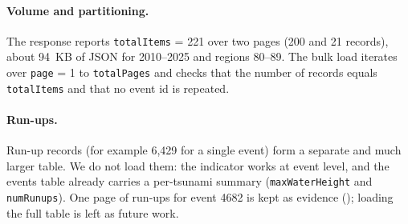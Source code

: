 \documentclass[a4paper,11pt,oneside]{book}
\begin{document}
\paragraph{Volume and partitioning.}
The response reports \texttt{totalItems} = 221 over two pages (200 and 21 records), about 94~KB of JSON for 2010--2025 and regions 80--89.
The bulk load iterates over \texttt{page} = 1 to \texttt{totalPages} and checks that the number of records equals \texttt{totalItems} and that no event id is repeated.

\paragraph{Run-ups.}
Run-up records (for example 6,429 for a single event) form a separate and much larger table.
We do not load them: the indicator works at event level, and the events table already carries a per-tsunami summary (\texttt{maxWaterHeight} and \texttt{numRunups}).
One page of run-ups for event 4682 is kept as evidence (); loading the full table is left as future work.
\end{document}
